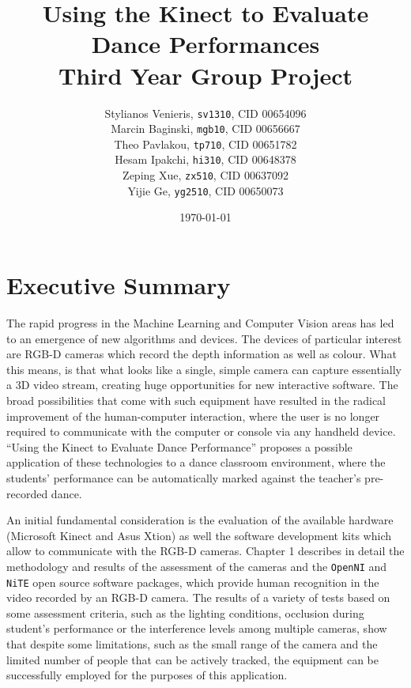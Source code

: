 \documentclass[11pt,a4paper]{article}
\begin{document}
\title{Using the Kinect to Evaluate Dance Performances\\ Third Year Group Project}
\author{Stylianos Venieris, \texttt{sv1310}, CID 00654096\\
Marcin Baginski, \texttt{mgb10}, CID 00656667\\
Theo Pavlakou, \texttt{tp710}, CID 00651782\\
Hesam Ipakchi, \texttt{hi310}, CID 00648378\\
Zeping Xue, \texttt{zx510}, CID 00637092\\
Yijie Ge, \texttt{yg2510}, CID 00650073 }
\date{\today}
\maketitle
{}
\newpage


\section*{\center Executive Summary}
The rapid progress in the Machine Learning and Computer Vision areas has led to an emergence of new algorithms and devices. The devices of particular interest are RGB-D cameras which record the depth information as well as colour. What this means, is that what looks like a single, simple camera can capture essentially a 3D video stream, creating huge opportunities for new interactive software. The broad possibilities that come with such equipment have resulted in the radical improvement of the human-computer interaction, where the user is no longer required to communicate with the computer or console via any handheld device. ``Using the Kinect to Evaluate Dance Performance'' proposes a possible application of these technologies to a dance classroom environment, where the students' performance can be automatically marked against the teacher's pre-recorded dance.

\noindent
An initial fundamental consideration is the evaluation of the available hardware (Microsoft Kinect and Asus Xtion) as well the software development kits which allow to communicate with the RGB-D cameras. Chapter 1 describes in detail the methodology and results of the assessment of the cameras and the \texttt{OpenNI} and \texttt{NiTE} open source software packages, which provide human recognition in the video recorded by an RGB-D camera. The results of a variety of tests based on some assessment criteria, such as the lighting conditions, occlusion during student's performance or the interference levels among multiple cameras, show that despite some limitations, such as the small range of the camera and the limited number of people that can be actively tracked, the equipment can be successfully employed for the purposes of this application.
\end{document}
